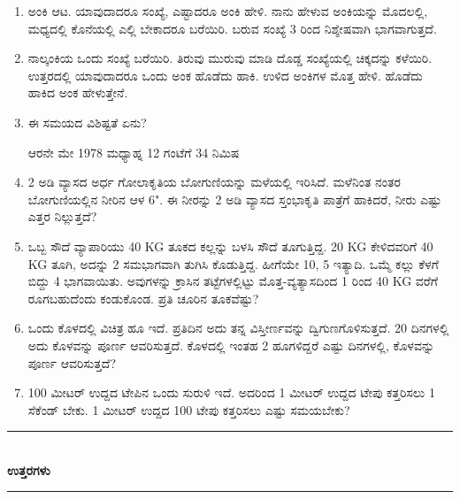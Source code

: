 \begin{enumerate}
{\bf ಆಶಯ :} ಒಬ್ಬ ಕೂಡಿಗ (ಹಾಲು ಮಾರುವವನು). ಅವನಿಗೆ 9 ಹೆಂಡತಿಯರು. 81 ಎಮ್ಮೆಗಳನ್ನು ಕೊಂಡು ತರುತ್ತಾನೆ. 1ನೆ ಎಮ್ಮೆ 1 ಅಳತೆ, 2ನೆ ಎಮ್ಮೆ  2 ಅಳತೆ . . . . . 81ನೆ ಎಮ್ಮೆ 81 ಅಳತೆ ಹಾಲು ಕೊಡುತ್ತದೆ. ಹೆಂಡತಿಯರಿಗೆ ರಾಸೂ ಸಮ, ಹಾಲೂ ಸಮ ಆಗುವಂತೆ ಹಂಚಿ. 

\item ಅಂಕಿ ಆಟ. ಯಾವುದಾದರೂ ಸಂಖ್ಯೆ, ಎಷ್ಟಾದರೂ ಅಂಕಿ ಹೇಳಿ. ನಾನು ಹೇಳುವ ಅಂಕಿಯನ್ನು ಮೊದಲಲ್ಲಿ, ಮಧ್ಯದಲ್ಲಿ ಕೊನೆಯಲ್ಲಿ ಎಲ್ಲಿ ಬೇಕಾದರೂ ಬರೆಯಿರಿ. ಬರುವ ಸಂಖ್ಯೆ 3 ರಿಂದ ನಿಶ್ಶೇಷವಾಗಿ ಭಾಗವಾಗುತ್ತದೆ.

\item ನಾಲ್ಕಂಕಿಯ ಒಂದು ಸಂಖ್ಯೆ ಬರೆಯಿರಿ. ತಿರುವು ಮುರುವು ಮಾಡಿ ದೊಡ್ಡ ಸಂಖ್ಯೆಯಲ್ಲಿ ಚಿಕ್ಕದನ್ನು ಕಳೆಯಿರಿ. ಉತ್ತರದಲ್ಲಿ ಯಾವುದಾದರೂ ಒಂದು ಅಂಕ ಹೊಡೆದು ಹಾಕಿ. ಉಳಿದ ಅಂಕಿಗಳ ಮೊತ್ತ ಹೇಳಿ. ಹೊಡೆದು ಹಾಕಿದ ಅಂಕ ಹೇಳುತ್ತೇನೆ.

\item ಈ ಸಮಯದ ವಿಶಿಷ್ಟತೆ ಏನು?

ಆರನೇ ಮೇ 1978 ಮಧ್ಯಾಹ್ನ 12 ಗಂಟೆಗೆ 34 ನಿಮಿಷ 

\item 2 ಅಡಿ ವ್ಯಾಸದ ಅರ್ಧ ಗೋಲಾಕೃತಿಯ ಬೋಗುಣಿಯನ್ನು ಮಳೆಯಲ್ಲಿ ಇರಿಸಿದೆ. ಮಳೆನಿಂತ ನಂತರ ಬೋಗು‌ಣಿಯಲ್ಲಿನ ನೀರಿನ ಆಳ 6". ಈ ನೀರನ್ನು 2 ಅಡಿ ವ್ಯಾಸದ ಸ್ತಂಭಾಕೃತಿ ಪಾತ್ರೆಗೆ ಹಾಕಿದರೆ, ನೀರು ಎಷ್ಟು ಎತ್ತರ ನಿಲ್ಲುತ್ತದೆ? 

\item ಒಬ್ಬ ಸೌದೆ ವ್ಯಾಪಾರಿಯು 40 KG ತೂಕದ ಕಲ್ಲನ್ನು ಬಳಸಿ ಸೌದೆ ತೂಗುತ್ತಿದ್ದ. 20 KG ಕೇಳಿದವರಿಗೆ 40 KG ತೂಗಿ, ಅದನ್ನು 2 ಸಮಭಾಗವಾಗಿ ತುಗಿಸಿ ಕೊಡುತ್ತಿದ್ದ. ಹೀಗೆಯೇ 10, 5 ಇತ್ಯಾದಿ. ಒಮ್ಮೆ ಕಲ್ಲು ಕೆಳಗೆ ಬಿದ್ದು 4 ಭಾಗವಾಯಿತು. ಅವುಗಳನ್ನು ಕ್ರಾಸಿನ ತಟ್ಟೆಗಳಲ್ಲಿಟ್ಟು ಮೊತ್ತ-ವ್ಯತ್ಯಾಸದಿಂದ 1 ರಿಂದ 40 KG ವರೆಗೆ ರೂಗಬಹುದೆಂದು ಕಂಡುಕೊಂಡ. ಪ್ರತಿ ಚೂರಿನ ತೂಕವೆಷ್ಟು? 

\item ಒಂದು ಕೊಳದಲ್ಲಿ ವಿಚಿತ್ರ ಹೂ ಇದೆ. ಪ್ರತಿದಿನ ಅದು ತನ್ನ ವಿಸ್ತೀರ್ಣವನ್ನು ದ್ವಿಗುಣಗೊಳಿಸುತ್ತದೆ. 20 ದಿನಗಳಲ್ಲಿ ಅದು ಕೊಳವನ್ನು ಪೂರ್ಣ ಆವರಿಸುತ್ತದೆ. ಕೊಳದಲ್ಲಿ ಇಂತಹ 2 ಹೂಗಳಿದ್ದರೆ ಎಷ್ಟು ದಿನಗಳಲ್ಲಿ, ಕೊಳವನ್ನು ಪೂರ್ಣ ಆವರಿಸುತ್ತದೆ?

\item 100 ಮೀಟರ್ ಉದ್ದದ ಟೇಪಿನ ಒಂದು ಸುರುಳಿ ಇದೆ. ಅದರಿಂದ 1 ಮೀಟರ್ ಉದ್ದದ ಟೇಪು ಕತ್ತರಿಸಲು 1 ಸೆಕೆಂಡ್ ಬೇಕು. 1 ಮೀಟರ್ ಉದ್ದದ 100 ಟೇಪು ಕತ್ತರಿಸಲು ಎಷ್ಟು ಸಮಯಬೇಕು? 
\end{enumerate}

\smallskip

\begin{center}
\rule{5cm}{1pt}\\[5pt]
{\Large\bfseries ಉತ್ತರಗಳು}\\[3pt]
\rule{5cm}{1pt}
\end{center}

